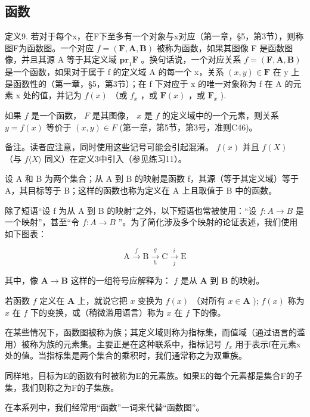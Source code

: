 \subsection{函数}

定义9. 若对于每个x，在F下至多有一个对象与x对应（第一章，§5，第3节），则称图F为函数图。一个对应 \(f = (\mathbf{F}, \mathbf{A}, \mathbf{B})\) 被称为函数，如果其图像 F 是函数图像，并且其源 A 等于其定义域 \(\mathbf{pr}_1\mathbf{F}\) 。换句话说，一个对应关系 \(f = (\mathbf{F}, \mathbf{A}, \mathbf{B})\) 是一个函数，如果对于属于 f 的定义域 A 的每一个 x，关系 \((x, y) \in \mathbf{F}\) 在 y 上是函数性的（第一章，§5，第3节）；在 f 下对应于 x 的唯一对象称为 f 在 A 的元素 x 处的值，并记为 \(f(x)\) （或 \(f_x\) ，或 \(\mathbf{F}(x)\) ，或 \(\mathbf{F}_x\) ).

如果 \(f\) 是一个函数， \(F\) 是其图像， \(x\) 是 \(f\) 的定义域中的一个元素，则关系 \(y = f(x)\) 等价于 \((x, y) \in F\) (第一章，第5节，第3号，准则C46)。

备注。读者应注意，同时使用这些记号可能会引起混淆。 \(f(x)\) 并且 \(f(X)\) （与 \(f\langle X\rangle\) 同义）在定义3中引入（参见练习11）。

设 A 和 B 为两个集合；从 A 到 B 的映射是函数 f，其源（等于其定义域）等于 A，其目标等于 B；这样的函数也称为定义在 A 上且取值于 B 中的函数。

除了短语“设 f 为从 A 到 B 的映射”之外，以下短语也常被使用：“设 \(f: A \rightarrow B\) 是一个映射''，甚至“令 \(f: A \rightarrow B\) ''。为了简化涉及多个映射的论证表述，我们使用如下图表：

\[
\mathrm{A} \xrightarrow {f} \mathrm{B} \xrightarrow [ h ]{g} \mathrm{C} \xrightarrow [ j ]{i} \mathrm{E}
\]

其中，像 \(\mathbf{A} \to \mathbf{B}\) 这样的一组符号应解释为： \(f\) 是从 \(\mathbf{A}\) 到 \(\mathbf{B}\) 的映射。

若函数 \(f\) 定义在 \(\mathbf{A}\) 上，就说它把 \(x\) 变换为 \(f(x)\) （对所有 \(x \in \mathbf{A}\) ); \(f(x)\) 称为 \(x\) 在 \(f\) 下的变换，或（稍微滥用语言）称为 \(x\) 在 \(f\) 下的像。

在某些情况下，函数图被称为族；其定义域则称为指标集，而值域（通过语言的滥用）被称为族的元素集。主要正是在这种联系中，指标记号 \(f_{x}\) 用于表示f在元素x处的值。当指标集是两个集合的乘积时，我们通常称之为双重族。

同样地，目标为E的函数有时被称为E的元素族。如果E的每个元素都是集合F的子集，我们则称之为F的子集族。

在本系列中，我们经常用“函数”一词来代替“函数图”。

